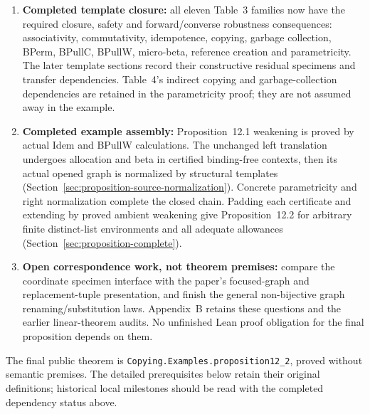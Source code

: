 \begin{enumerate}
matching cases are quantitative in both directions.
Section~\ref{sec:copying-operational-forward-robustness} now completes allocation
and assignment residuals, general deep beta/copying extraction, and universal
forward robustness of both operational templates. It classifies every actual
converse rewrite using retained matches or original-context store/copy selectors.
Section~\ref{sec:copying-operational-converse-robustness} completes that
synthesis, including two selected inputs for same-store equality. Universal
converse robustness and the contextual improvement/termination consequences
are now proved for both operational families.
\item \textbf{Completed template closure:} all eleven Table~3 families now
have the required closure, safety and forward/converse robustness consequences:
associativity, commutativity, idempotence, copying, garbage collection,
BPerm, BPullC, BPullW, micro-beta, reference creation and parametricity.
The later template sections record their constructive residual specimens and
transfer dependencies. Table~4's indirect copying and garbage-collection
dependencies are retained in the parametricity proof; they are not assumed
away in the example.
\item \textbf{Completed example assembly:} Proposition~12.1 weakening is
proved by actual Idem and BPullW calculations. The unchanged left translation
undergoes allocation and beta in certified binding-free contexts, then its
actual opened graph is normalized by structural templates
(Section~\ref{sec:proposition-source-normalization}). Concrete parametricity
and right normalization complete the closed chain. Padding each certificate
and extending by proved ambient weakening give Proposition~12.2 for arbitrary
finite distinct-list environments and all adequate allowances
(Section~\ref{sec:proposition-complete}).
\item \textbf{Open correspondence work, not theorem premises:} compare the
coordinate specimen interface with the paper's focused-graph and replacement-tuple
presentation, and finish the general non-bijective graph renaming/substitution
laws. Appendix~B retains these questions and the earlier linear-theorem audits.
No unfinished Lean proof obligation for the final proposition depends on them.
\end{enumerate}
The final public theorem is
\texttt{Copying.Examples.proposition12\_2}, proved without semantic premises.
The detailed prerequisites below retain their original definitions; historical
local milestones should be read with the completed dependency status above.

